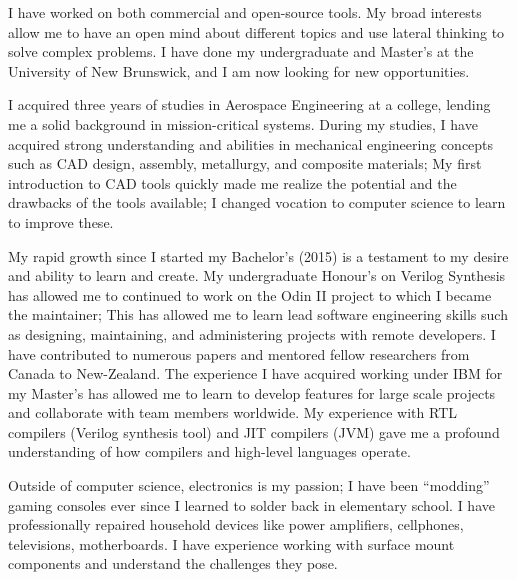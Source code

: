 I have worked on both commercial and open-source tools.
My broad interests allow me to have an open mind about different topics and use lateral thinking to solve complex problems.
I have done my undergraduate and Master's at the University of New Brunswick, and I am now looking for new opportunities.

I acquired three years of studies in Aerospace Engineering at a college, lending me a solid background in mission-critical systems.
During my studies, I have acquired strong understanding and abilities in mechanical engineering concepts such as CAD design, assembly, metallurgy, and composite materials;
My first introduction to CAD tools quickly made me realize the potential and the drawbacks of the tools available; I changed vocation to computer science to learn to improve these.

My rapid growth since I started my Bachelor's (2015) is a testament to my desire and ability to learn and create.
My undergraduate Honour's on Verilog Synthesis has allowed me to continued to work on the Odin II project to which I became the maintainer; 
This has allowed me to learn lead software engineering skills such as designing, maintaining, and administering projects with remote developers.
I have contributed to numerous papers and mentored fellow researchers from Canada to New-Zealand.
The experience I have acquired working under IBM for my Master's has allowed me to learn to develop features for large scale projects and collaborate with team members worldwide.
My experience with RTL compilers (Verilog synthesis tool) and JIT compilers (JVM) gave me a profound understanding of how compilers and high-level languages operate.

Outside of computer science, electronics is my passion; I have been ``modding'' gaming consoles ever since I learned to solder back in elementary school.
I have professionally repaired household devices like power amplifiers, cellphones, televisions, motherboards.
I have experience working with surface mount components and understand the challenges they pose.
